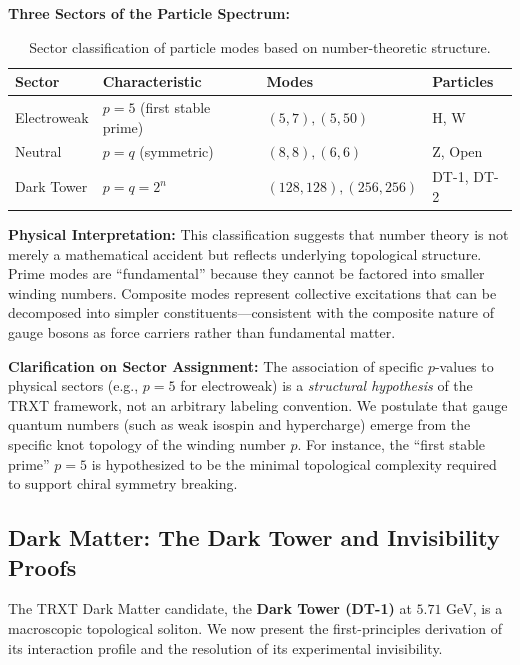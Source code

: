 \documentclass[a4paper,12pt]{article}
\begin{document}
\textbf{Three Sectors of the Particle Spectrum:}

\begin{table}[H]
\centering
\small
\begin{tabular}{llll}
\toprule
\textbf{Sector} & \textbf{Characteristic} & \textbf{Modes} & \textbf{Particles} \\
\midrule
Electroweak & $p = 5$ (first stable prime) & $(5, 7), (5, 50)$ & H, W \\
Neutral & $p = q$ (symmetric) & $(8, 8), (6, 6)$ & Z, Open \\
Dark Tower & $p = q = 2^n$ & $(128, 128), (256, 256)$ & DT-1, DT-2 \\
\bottomrule
\end{tabular}
\caption{Sector classification of particle modes based on number-theoretic structure.}
\label{tab:sectors}
\end{table}

\textbf{Physical Interpretation:}
This classification suggests that number theory is not merely a mathematical accident but reflects underlying topological structure. Prime modes are ``fundamental'' because they cannot be factored into smaller winding numbers. Composite modes represent collective excitations that can be decomposed into simpler constituents---consistent with the composite nature of gauge bosons as force carriers rather than fundamental matter.

\textbf{Clarification on Sector Assignment:}
The association of specific $p$-values to physical sectors (e.g., $p=5$ for electroweak) is a \emph{structural hypothesis} of the TRXT framework, not an arbitrary labeling convention. We postulate that gauge quantum numbers (such as weak isospin and hypercharge) emerge from the specific knot topology of the winding number $p$. For instance, the ``first stable prime'' $p=5$ is hypothesized to be the minimal topological complexity required to support chiral symmetry breaking.


\subsection{Dark Matter: The Dark Tower and Invisibility Proofs}
\label{sec:dark_matter_v12}

The TRXT Dark Matter candidate, the \textbf{Dark Tower (DT-1)} at $5.71$ GeV, is a macroscopic topological soliton. We now present the first-principles derivation of its interaction profile and the resolution of its experimental invisibility.
\end{document}

